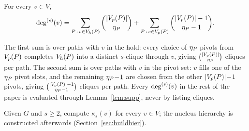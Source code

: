 \begin{lemma}\label{lem:supp}
For every $v\in V$,
\[
  \sdeg(v)
  =
  \sum_{\TPath\,:\,v\in\Vh(\TPath)}\binom{|\Vp(\TPath)|}{\eta_{\TPath}}
  +
  \sum_{\TPath\,:\,v\in\Vp(\TPath)}\binom{|\Vp(\TPath)|-1}{\eta_{\TPath}-1}.
\]
\end{lemma}

The first sum is over paths with $v$ in the hold: every choice of $\eta_{\TPath}$ pivots from $\Vp(\TPath)$ completes $\Vh(\TPath)$ into a distinct $s$-clique through $v$, giving $\binom{|\Vp(\TPath)|}{\eta_{\TPath}}$ cliques per path.
%
The second sum is over paths with $v$ in the pivot set: $v$ fills one of the $\eta_{\TPath}$ pivot slots, and the remaining $\eta_{\TPath}\!-\!1$ are chosen from the other $|\Vp(\TPath)|\!-\!1$ pivots, giving $\binom{|\Vp(\TPath)|-1}{\eta_{\TPath}-1}$ cliques per path.
%
Every $\deg^{(s)}(v)$ in the rest of the paper is evaluated through Lemma~\ref{lem:supp}, never by listing cliques.

Given $G$ and $s\ge2$, compute $\kappa_s(v)$ for every $v\in V$; the nucleus hierarchy is constructed afterwards (Section~\ref{sec:buildhier}).
